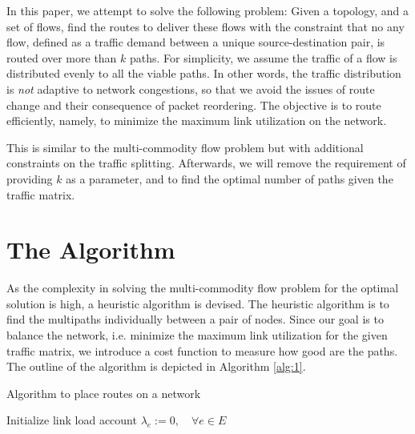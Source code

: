 \documentclass[conference]{IEEEtran}
\begin{document}
In this paper, we attempt to solve the following problem: Given a topology, and
a set of flows, find the routes to deliver these flows with the constraint that
no any flow, defined as a traffic demand between a unique source-destination
pair, is routed over more than $k$ paths. For simplicity, we assume the traffic
of a flow is distributed evenly to all the viable paths. In other words, the
traffic distribution is \emph{not} adaptive to network congestions, so that we
avoid the issues of route change and their consequence of packet reordering.
The objective is to route efficiently, namely, to minimize the maximum link
utilization on the network.

This is similar to the multi-commodity flow problem \cite{pm04} but with
additional constraints on the traffic splitting. Afterwards, we will remove the
requirement of providing $k$ as a parameter, and to find the optimal number of
paths given the traffic matrix.

\section{The Algorithm}\label{sec:algo}

As the complexity in solving the multi-commodity flow problem for the optimal
solution is high, a heuristic algorithm is devised. The heuristic algorithm is
to find the multipaths individually between a pair of nodes. Since our goal is
to balance the network, i.e. minimize the maximum link utilization for the
given traffic matrix, we introduce a cost function to measure how good are the
paths. The outline of the algorithm is depicted in Algorithm \ref{alg:1}.

\begin{algorithm}
\caption{Algorithm to place routes on a network}\label{alg:1}
Initialize link load account $\lambda_e :=0,\quad\forall e\in E$\;
\end{algorithm}
\end{document}
